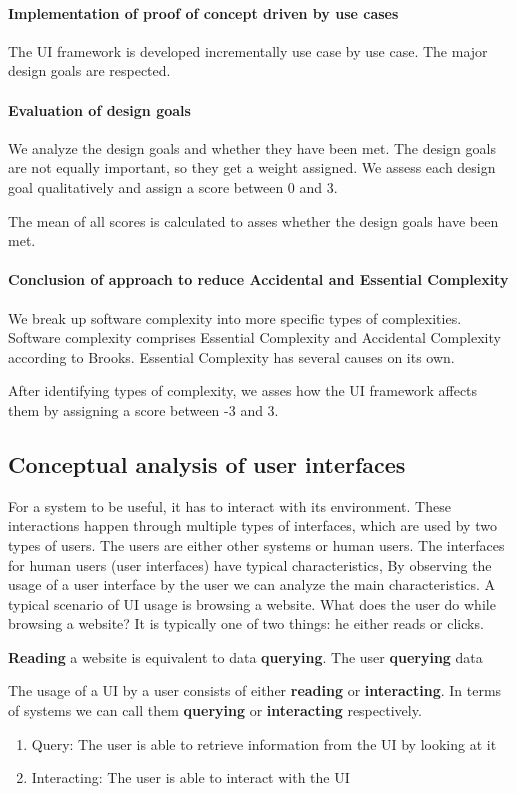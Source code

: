 \paragraph{Implementation of proof of concept driven by use cases}
The UI framework is developed incrementally use case by use case. The major design goals are respected.

\paragraph{Evaluation of design goals}
We analyze the design goals and whether they have been met. The design goals are not equally important, so they get a weight assigned. We assess each design goal qualitatively and assign a score between 0 and 3.

The mean of all scores is calculated to asses whether the design goals have been met.

\paragraph{Conclusion of approach to reduce Accidental and Essential Complexity}
We break up software complexity into more specific types of complexities. Software complexity comprises Essential Complexity and Accidental Complexity according to Brooks. Essential Complexity has several causes on its own.

After identifying types of complexity, we asses how the UI framework affects them by assigning a score between -3 and 3.

\subsection{Conceptual analysis of user interfaces}
For a system to be useful, it has to interact with its environment. These interactions happen through multiple types of interfaces, which are used by two types of users. The users are either other systems or human users.
The interfaces for human users (user interfaces) have typical characteristics,
By observing the usage of a user interface by the user we can analyze the main characteristics. A typical scenario of UI usage is browsing a website. What does the user do while browsing a website? It is typically one of two things: he either reads or clicks.

\textbf{Reading} a website is equivalent to data \textbf{querying}. The user \textbf{querying} data

The usage of a UI by a user consists of either \textbf{reading} or \textbf{interacting}. In terms of systems we can call them \textbf{querying} or \textbf{interacting} respectively.
\begin{enumerate}
  \item Query: The user is able to retrieve information from the UI by looking at it
  \item Interacting: The user is able to interact with the UI
\end{enumerate}

